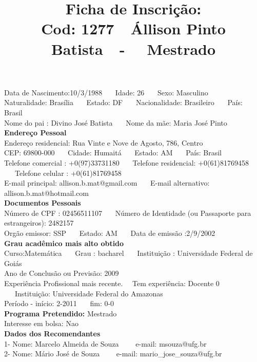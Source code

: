\documentclass[11pt]{article}
\title{\vspace*{-4cm} Ficha de Inscrição: \\Cod: 1277\ \ Állison Pinto Batista\ \ - \ \ Mestrado 
 }
\date{}
\begin{document}
\maketitle
\vspace*{-1.5cm}
\noindent Data de Nascimento:10/3/1988
\ \ \ Idade: 26   \ \ \ Sexo: Masculino
\\
Naturalidade: Brasília  
\ \ \  Estado: DF
\ \ \  Nacionalidade: Brasileiro
\ \ \ País: Brasil
\\        
Nome do pai : Divino José Batista
\ \ \ Nome da mãe: Maria José Pinto          
\\[0.2cm]                     
\textbf{Endereço Pessoal} 
\\ 
\noindent Endereço residencial: Rua Vinte e Nove de Agosto, 786, Centro
\\
        CEP: 69800-000 
\ \ \ Cidade: Humaitá 
\ \ \ Estado: AM 
\ \ \ País: Brasil
\\		
		Telefone comercial : +0(97)33731180
\ \ \ Telefone residencial: +0(61)81769458
\ \ \ Telefone celular : +0(61)81769458
\\
E-mail principal: allison.b.mat@gmail.com
\ \ \ E-mail alternativo: allison.b.mat@hotmail.com 
\\[0.2cm] 
\textbf{Documentos Pessoais}
\\
\noindent Número de CPF : 02456511107
\ \ \ Número de Identidade (ou Passaporte para estrangeiros): 2482157
\\
Orgão emissor: SSP
\ \ \ Estado: AM
\ \ \ Data de emissão :2/9/2002
\\[0.3cm]
\textbf{Grau acadêmico mais alto obtido}
\\	
Curso:Matemática
\ \ \ Grau : bacharel
\ \ \ Instituição : Universidade Federal de Goiás
\\			
Ano de Conclusão ou Previsão: 2009
\\ 
Experiência Profissional mais recente. \ \  
Tem experiência: Docente 0  
\ \ \ Instituição: Universidade Federal do Amazonas
\\  
Período - início: 2-2011
\ \ \ fim: 0-0
\\[0.2cm] 
\textbf{Programa Pretendido:} Mestrado\\
Interesse em bolsa: Nao
\\[0.3cm]		
\textbf{Dados dos Recomendantes} 
\\
1- Nome: Marcelo Almeida de Souza
\ \ \ \  e-mail: msouza@ufg.br 
\\
2- Nome: Mário José de Souza
\ \ \ \ e-mail: mario\_jose\_souza@ufg.br
\\
\end{document}

